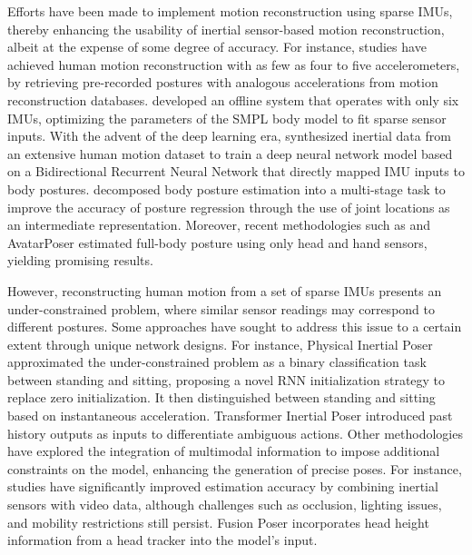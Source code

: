 \documentclass[letterpaper]{article} %
\begin{document}
Efforts have been made to implement motion reconstruction using sparse IMUs, thereby enhancing the usability of inertial sensor-based motion reconstruction, albeit at the expense of some degree of accuracy. For instance, studies \cite{slyper2008action,tautges2011motion} have achieved human motion reconstruction with as few as four to five accelerometers, by retrieving pre-recorded postures with analogous accelerations from motion reconstruction databases. \cite{von2017sparse} developed an offline system that operates with only six IMUs, optimizing the parameters of the SMPL body model \cite{loper2015smpl} to fit sparse sensor inputs. With the advent of the deep learning era, \cite{huang2018deep} synthesized inertial data from an extensive human motion dataset to train a deep neural network model based on a Bidirectional Recurrent Neural Network that directly mapped IMU inputs to body postures. \cite{yi2021transpose} decomposed body posture estimation into a multi-stage task to improve the accuracy of posture regression through the use of joint locations as an intermediate representation. Moreover, recent methodologies such as \cite{dittadi2021full} and AvatarPoser \cite{jiang2022avatarposer} estimated full-body posture using only head and hand sensors, yielding promising results.

However, reconstructing human motion from a set of sparse IMUs presents an under-constrained problem, where similar sensor readings may correspond to different postures. Some approaches have sought to address this issue to a certain extent through unique network designs. For instance, Physical Inertial Poser \cite{yi2022physical} approximated the under-constrained problem as a binary classification task between standing and sitting, proposing a novel RNN initialization strategy to replace zero initialization. It then distinguished between standing and sitting based on instantaneous acceleration. Transformer Inertial Poser \cite{jiang2022transformer} introduced past history outputs as inputs to differentiate ambiguous actions. 
Other methodologies have explored the integration of multimodal information to impose additional constraints on the model, enhancing the generation of precise poses. For instance, studies \cite{von2018recovering,malleson2017real,von2016human} have significantly improved estimation accuracy by combining inertial sensors with video data, although challenges such as occlusion, lighting issues, and mobility restrictions still persist. Fusion Poser \cite{kim2022fusion} incorporates head height information from a head tracker into the model's input.
\end{document}
